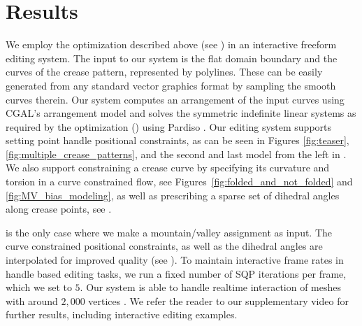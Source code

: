 \section{Results} \label{sec:results}

We employ the optimization described above (see ) in an interactive freeform editing system. The input to our system is the flat domain boundary and the curves of the crease pattern, represented by polylines. These can be easily generated from any standard vector graphics format by sampling the smooth curves therein. Our system computes an arrangement of the input curves using CGAL's arrangement model \cite{cgal,cgal_arr1,cgal_arr2} and solves the symmetric indefinite  linear systems as required by the optimization () using Pardiso \cite{PARDISO1,PARDISO2,PARDISO3}. Our editing system supports setting point handle positional constraints, as can be seen in Figures \ref{fig:teaser}, \ref{fig:multiple_crease_patterns}, and the second and last model from the left in . We also support  constraining a crease curve by specifying its curvature and torsion in a curve constrained flow,  see Figures~\ref{fig:folded_and_not_folded} and \ref{fig:MV_bias_modeling}, as well as prescribing a sparse set of dihedral angles along crease points, see . 

 is the only case where we make a mountain/valley assignment as input. The curve constrained positional constraints, as well as the dihedral angles are interpolated for improved quality (see ). To maintain interactive frame rates in handle based editing tasks, we run a fixed number of SQP iterations per frame, which we set to $5$. Our system is able to handle realtime interaction of meshes with around $2,000$ vertices . We refer the reader to our supplementary video for further results, including interactive editing examples. 

